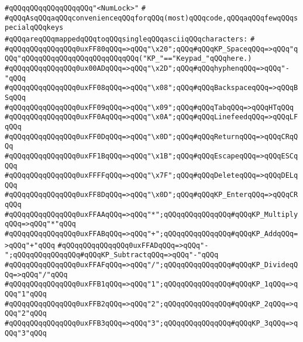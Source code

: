 \verb|#qQQqqQQqqQQqqQQqqQQq"<NumLock>"|\newline
\verb|#|\newline
\verb|#qQQqAsqQQqaqQQqconvenienceqQQqforqQQq(most)qQQqcode,qQQqaqQQqfewqQQqspecialqQQqkeys|\newline
\verb|#qQQqareqQQqmappedqQQqtoqQQqsingleqQQqasciiqQQqcharacters:|\newline
\verb|#|\newline
\verb|#qQQqqQQqqQQqqQQq0uxFF80qQQq=>qQQq"\x20";qQQq#qQQqKP_SpaceqQQq=>qQQq"qQQq"qQQqqQQqqQQqqQQqqQQqqQQqqQQq("KP_"=="Keypad_"qQQqhere.)|\newline
\verb|#qQQqqQQqqQQqqQQq0ux00ADqQQq=>qQQq"\x2D";qQQq#qQQqhyphenqQQq=>qQQq"-"qQQq|\newline
\verb|#qQQqqQQqqQQqqQQq0uxFF08qQQq=>qQQq"\x08";qQQq#qQQqBackspaceqQQq=>qQQqBSqQQq|\newline
\verb|#qQQqqQQqqQQqqQQq0uxFF09qQQq=>qQQq"\x09";qQQq#qQQqTabqQQq=>qQQqHTqQQq|\newline
\verb|#qQQqqQQqqQQqqQQq0uxFF0AqQQq=>qQQq"\x0A";qQQq#qQQqLinefeedqQQq=>qQQqLFqQQq|\newline
\verb|#qQQqqQQqqQQqqQQq0uxFF0DqQQq=>qQQq"\x0D";qQQq#qQQqReturnqQQq=>qQQqCRqQQq|\newline
\verb|#qQQqqQQqqQQqqQQq0uxFF1BqQQq=>qQQq"\x1B";qQQq#qQQqEscapeqQQq=>qQQqESCqQQq|\newline
\verb|#qQQqqQQqqQQqqQQq0uxFFFFqQQq=>qQQq"\x7F";qQQq#qQQqDeleteqQQq=>qQQqDELqQQq|\newline
\verb|#qQQqqQQqqQQqqQQq0uxFF8DqQQq=>qQQq"\x0D";qQQq#qQQqKP_EnterqQQq=>qQQqCRqQQq|\newline
\verb|#qQQqqQQqqQQqqQQq0uxFFAAqQQq=>qQQq"*";qQQqqQQqqQQqqQQq#qQQqKP_MultiplyqQQq=>qQQq"*"qQQq|\newline
\verb|#qQQqqQQqqQQqqQQq0uxFFABqQQq=>qQQq"+";qQQqqQQqqQQqqQQq#qQQqKP_AddqQQq=>qQQq"+"qQQq|\newline
\verb|#qQQqqQQqqQQqqQQq0uxFFADqQQq=>qQQq"-";qQQqqQQqqQQqqQQq#qQQqKP_SubtractqQQq=>qQQq"-"qQQq|\newline
\verb|#qQQqqQQqqQQqqQQq0uxFFAFqQQq=>qQQq"/";qQQqqQQqqQQqqQQq#qQQqKP_DivideqQQq=>qQQq"/"qQQq|\newline
\verb|#qQQqqQQqqQQqqQQq0uxFFB1qQQq=>qQQq"1";qQQqqQQqqQQqqQQq#qQQqKP_1qQQq=>qQQq"1"qQQq|\newline
\verb|#qQQqqQQqqQQqqQQq0uxFFB2qQQq=>qQQq"2";qQQqqQQqqQQqqQQq#qQQqKP_2qQQq=>qQQq"2"qQQq|\newline
\verb|#qQQqqQQqqQQqqQQq0uxFFB3qQQq=>qQQq"3";qQQqqQQqqQQqqQQq#qQQqKP_3qQQq=>qQQq"3"qQQq|\newline

